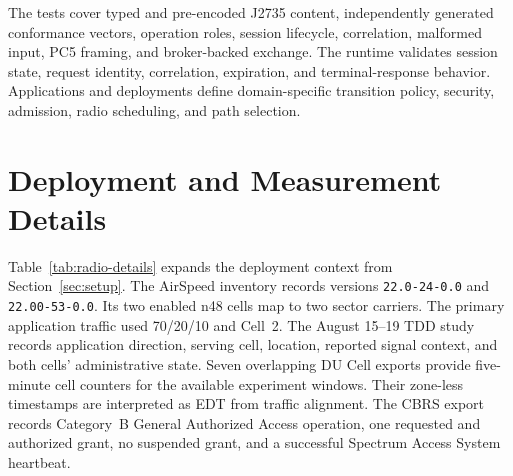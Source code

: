 The tests cover typed and pre-encoded J2735 content, independently generated
conformance vectors, operation roles, session lifecycle, correlation, malformed
input, PC5 framing, and broker-backed exchange. The runtime validates session
state, request identity, correlation, expiration, and terminal-response
behavior. Applications and deployments define domain-specific transition
policy, security, admission, radio scheduling, and path selection.

\section{Deployment and Measurement Details}
\label{app:setup}

Table~\ref{tab:radio-details} expands the deployment context from
Section~\ref{sec:setup}. The AirSpeed inventory records versions
\texttt{22.0-24-0.0} and \texttt{22.00-53-0.0}. Its two
enabled n48 cells map to two sector carriers. The primary application traffic
used 70/20/10 and Cell~2. The August 15--19 TDD study records application
direction, serving cell, location, reported signal context, and both cells'
administrative state. Seven overlapping DU Cell exports provide five-minute
cell counters for the available experiment windows. Their zone-less timestamps
are interpreted as EDT from traffic alignment. The CBRS export records
Category~B General Authorized Access
operation, one requested and authorized grant, no suspended grant, and a
successful Spectrum Access System heartbeat.

